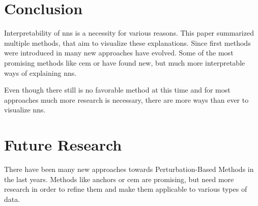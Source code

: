 \section{Conclusion}
Interpretability of \glspl{nn} is a necessity for various reasons. This paper summarized multiple methods, that aim to visualize these explanations. Since first methods were introduced in \cite{RobnikSikonja.2008} many new approaches have evolved. Some of the most promising methods like \gls{cem} or  have found new, but much more interpretable ways of explaining \glspl{nn}. 
\par
Even though there still is no favorable method at this time and for most approaches much more research is necessary, there are more ways than ever to visualize \glspl{nn}.

\section{Future Research}
There have been many new approaches towards Perturbation-Based Methods in the last years. Methods like anchors or \gls{cem} are promising, but need more research in order to refine them and make them applicable to various types of data. 
